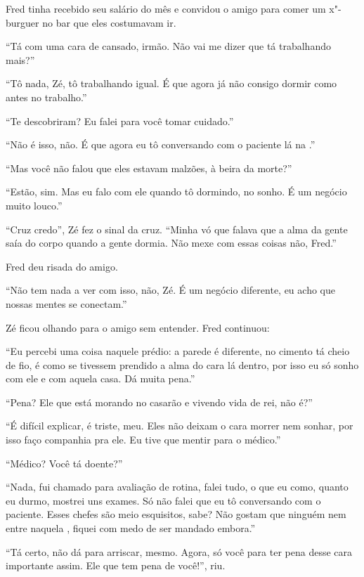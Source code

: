 \asterisc


Fred tinha recebido seu salário do mês e convidou o amigo para comer um
x"-burguer no bar que eles costumavam ir.

``Tá com uma cara de cansado, irmão. Não vai me dizer que tá trabalhando
mais?''

``Tô nada, Zé, tô trabalhando igual. É que agora já não consigo dormir
como antes no trabalho.''

``Te descobriram? Eu falei para você tomar cuidado.''

``Não é isso, não. É que agora eu tô conversando com o paciente lá na
.''

``Mas você não falou que eles estavam malzões, à beira da morte?''

``Estão, sim. Mas eu falo com ele quando tô dormindo, no sonho. É um
negócio muito louco.''

``Cruz credo'', Zé fez o sinal da cruz. ``Minha vó que falava que a
alma da gente saía do corpo quando a gente dormia. Não mexe com essas
coisas não, Fred.''

Fred deu risada do amigo.

``Não tem nada a ver com isso, não, Zé. É um negócio diferente, eu acho
que nossas mentes se conectam.''

Zé ficou olhando para o amigo sem entender. Fred continuou:

``Eu percebi uma coisa naquele prédio: a parede é diferente, no cimento
tá cheio de fio, é como se tivessem prendido a alma do cara lá dentro,
por isso eu só sonho com ele e com aquela casa. Dá muita pena.''

``Pena? Ele que está morando no casarão e vivendo vida de rei, não é?''

``É difícil explicar, é triste, meu. Eles não deixam o cara morrer nem
sonhar, por isso faço companhia pra ele. Eu tive que mentir para o
médico.''

``Médico? Você tá doente?''

``Nada, fui chamado para avaliação de rotina, falei tudo, o que eu como,
quanto eu durmo, mostrei uns exames. Só não falei que eu tô conversando
com o paciente. Esses chefes são meio esquisitos, sabe? Não gostam que
ninguém nem entre naquela , fiquei com medo de ser mandado embora.''

``Tá certo, não dá para arriscar, mesmo. Agora, só você para
ter pena desse cara importante assim. Ele que tem pena de você!'', riu.

